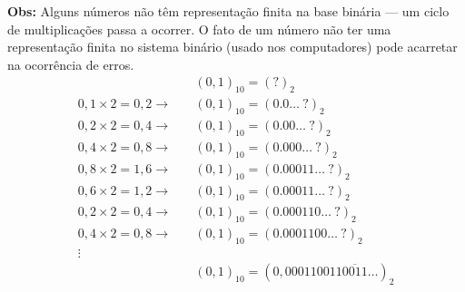 \documentclass[a4paper,oneside,article,table]{article}
\begin{document}
\begin{enumerate}
                \textbf{Obs:} Alguns números não têm representação finita na base binária --- um ciclo de multiplicações passa a ocorrer. O fato de um número não ter uma representação finita no sistema binário (usado nos computadores) pode acarretar na ocorrência de erros.
                \begin{align*}
                    &{(0,1)}_{10} = {(?)}_2\\
                    0,1 \times 2 = \boxed{0},2 \rightarrow \quad &{(0,1)}_{10} = {(0.\boxed{0}\ldots~?)}_2\\
                    0,2 \times 2 = \boxed{0},4 \rightarrow \quad &{(0,1)}_{10} = {(0.0\boxed{0}\ldots~?)}_2\\
                    0,4 \times 2 = \boxed{0},8 \rightarrow \quad &{(0,1)}_{10} = {(0.00\boxed{0}\ldots~?)}_2\\
                    0,8 \times 2 = \boxed{1},6 \rightarrow \quad &{(0,1)}_{10} = {(0.0001\boxed{1}\ldots~?)}_2\\
                    0,6 \times 2 = \boxed{1},2 \rightarrow \quad &{(0,1)}_{10} = {(0.0001\boxed{1}\ldots~?)}_2\\
                    0,2 \times 2 = \boxed{0},4 \rightarrow \quad &{(0,1)}_{10} = {(0.00011\boxed{0}\ldots~?)}_2\\
                    0,4 \times 2 = \boxed{0},8 \rightarrow \quad &{(0,1)}_{10} = {(0.000110\boxed{0}\ldots~?)}_2\\
                    \vdots\\
                    &{(0,1)}_{10} = {(0,000110011\overline{0011}\ldots)}_2\\
                \end{align*}

        \end{enumerate}
\end{document}
